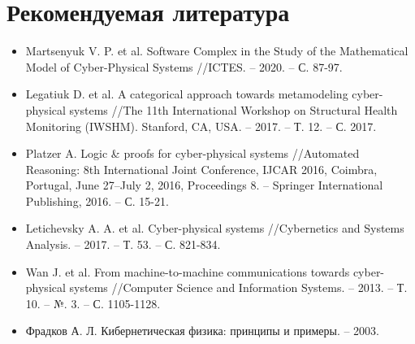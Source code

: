 \documentclass[12pt]{article}
\begin{document}
\begin{sloppypar}
    \section{Рекомендуемая литература}
    \begin{itemize}
        \item Martsenyuk V. P. et al. Software Complex in the Study of the Mathematical Model of Cyber-Physical Systems //ICTES. – 2020. – С. 87-97.
        \item Legatiuk D. et al. A categorical approach towards metamodeling cyber-physical systems //The 11th International Workshop on Structural Health Monitoring (IWSHM). Stanford, CA, USA. – 2017. – Т. 12. – С. 2017.
        \item Platzer A. Logic \& proofs for cyber-physical systems //Automated Reasoning: 8th International Joint Conference, IJCAR 2016, Coimbra, Portugal, June 27–July 2, 2016, Proceedings 8. – Springer International Publishing, 2016. – С. 15-21.
        \item Letichevsky A. A. et al. Cyber-physical systems //Cybernetics and Systems Analysis. – 2017. – Т. 53. – С. 821-834.
        \item Wan J. et al. From machine-to-machine communications towards cyber-physical systems //Computer Science and Information Systems. – 2013. – Т. 10. – №. 3. – С. 1105-1128.
        \item Фрадков А. Л. Кибернетическая физика: принципы и примеры. – 2003.
    \end{itemize}


\end{sloppypar}
\end{document}
